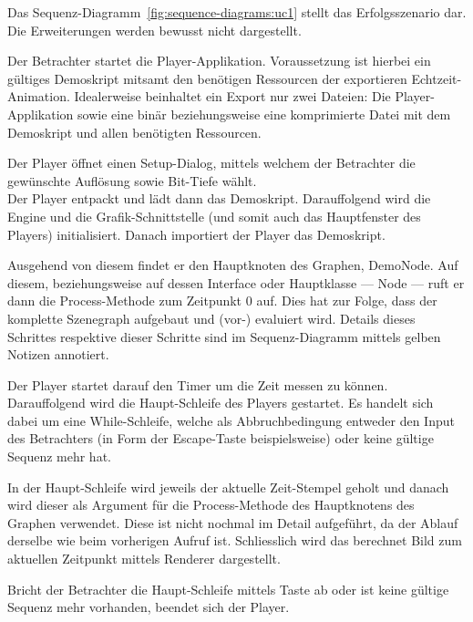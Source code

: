 Das Sequenz-Diagramm~\ref{fig:sequence-diagrams:uc1} stellt das Erfolgsszenario
dar. Die Erweiterungen werden bewusst nicht dargestellt.

Der Betrachter startet die Player-Applikation. Voraussetzung ist hierbei ein
gültiges Demoskript mitsamt den benötigen Ressourcen der exportieren
Echtzeit-Animation. Idealerweise beinhaltet ein Export nur zwei Dateien: Die
Player-Applikation sowie eine binär beziehungsweise eine komprimierte Datei mit
dem Demoskript und allen benötigten Ressourcen.

Der Player öffnet einen Setup-Dialog, mittels welchem der Betrachter die
gewünschte Auflösung sowie Bit-Tiefe wählt.\\
Der Player entpackt und lädt dann das Demoskript. Darauffolgend wird die Engine
und die Grafik-Schnittstelle (und somit auch das Hauptfenster des Players)
initialisiert. Danach importiert der Player das Demoskript.

Ausgehend von diesem findet er den Hauptknoten des Graphen, DemoNode. Auf
diesem, beziehungsweise auf dessen Interface oder Hauptklasse --- Node --- ruft
er dann die Process-Methode zum Zeitpunkt 0 auf. Dies hat zur Folge, dass der
komplette Szenegraph aufgebaut und (vor-) evaluiert wird. Details dieses
Schrittes respektive dieser Schritte sind im Sequenz-Diagramm mittels gelben
Notizen annotiert.

Der Player startet darauf den Timer um die Zeit messen zu können. Darauffolgend
wird die Haupt-Schleife des Players gestartet. Es handelt sich dabei um eine
While-Schleife, welche als Abbruchbedingung entweder den Input des Betrachters
(in Form der Escape-Taste beispielsweise) oder keine gültige Sequenz mehr hat.

In der Haupt-Schleife wird jeweils der aktuelle Zeit-Stempel geholt und danach
wird dieser als Argument für die Process-Methode des Hauptknotens des Graphen
verwendet. Diese ist nicht nochmal im Detail aufgeführt, da der Ablauf derselbe
wie beim vorherigen Aufruf ist. Schliesslich wird das berechnet Bild zum
aktuellen Zeitpunkt mittels Renderer dargestellt.

Bricht der Betrachter die Haupt-Schleife mittels Taste ab oder ist keine
gültige Sequenz mehr vorhanden, beendet sich der Player.
